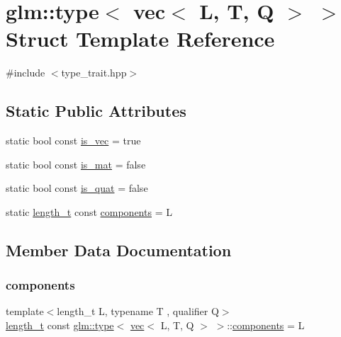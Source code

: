 \hypertarget{structglm_1_1type_3_01vec_3_01_l_00_01_t_00_01_q_01_4_01_4}{}\section{glm\+:\+:type$<$ vec$<$ L, T, Q $>$ $>$ Struct Template Reference}
\label{structglm_1_1type_3_01vec_3_01_l_00_01_t_00_01_q_01_4_01_4}


{\ttfamily \#include $<$type\+\_\+trait.\+hpp$>$}

\subsection*{Static Public Attributes}
\begin{DoxyCompactItemize}
\item 
static bool const \mbox{\hyperlink{structglm_1_1type_3_01vec_3_01_l_00_01_t_00_01_q_01_4_01_4_a43041d99d1a7516c028d1f8dd8ac7daf}{is\+\_\+vec}} = true
\item 
static bool const \mbox{\hyperlink{structglm_1_1type_3_01vec_3_01_l_00_01_t_00_01_q_01_4_01_4_a22bba98c88e09815e508383d406fcbab}{is\+\_\+mat}} = false
\item 
static bool const \mbox{\hyperlink{structglm_1_1type_3_01vec_3_01_l_00_01_t_00_01_q_01_4_01_4_a3ffd0878bcefe94549e17188bfb500d5}{is\+\_\+quat}} = false
\item 
static \mbox{\hyperlink{namespaceglm_a090a0de2260835bee80e71a702492ed9}{length\+\_\+t}} const \mbox{\hyperlink{structglm_1_1type_3_01vec_3_01_l_00_01_t_00_01_q_01_4_01_4_acfe23241fdf64745cc6310996c36aee6}{components}} = L
\end{DoxyCompactItemize}


\subsection{Member Data Documentation}
\mbox{\label{structglm_1_1type_3_01vec_3_01_l_00_01_t_00_01_q_01_4_01_4_acfe23241fdf64745cc6310996c36aee6}} 
\subsubsection{\texorpdfstring{components}{components}}
{\footnotesize\ttfamily template$<$length\+\_\+t L, typename T , qualifier Q$>$ \\
\mbox{\hyperlink{namespaceglm_a090a0de2260835bee80e71a702492ed9}{length\+\_\+t}} const \mbox{\hyperlink{structglm_1_1type}{glm\+::type}}$<$ \mbox{\hyperlink{structglm_1_1vec}{vec}}$<$ L, T, Q $>$ $>$\+::\mbox{\hyperlink{_s_d_l__opengl__glext_8h_a3824c86dfa50d23068c74eafb87375c2}{components}} = L\hspace{0.3cm}{\ttfamily [static]}}

